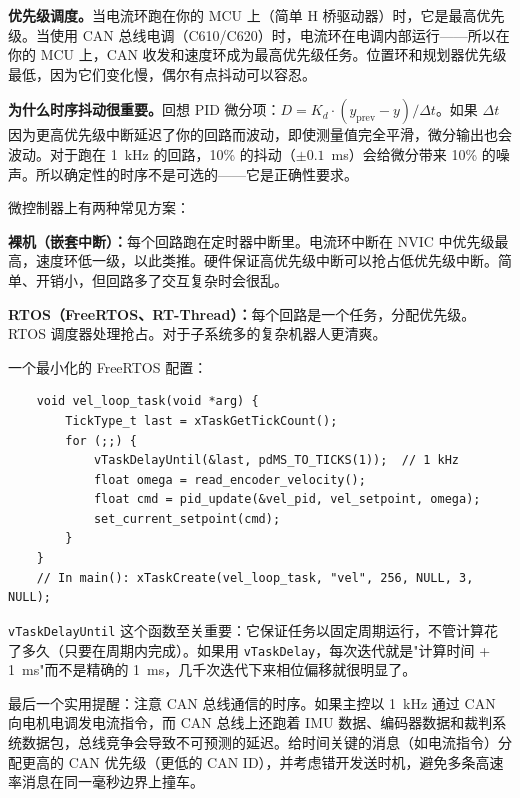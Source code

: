 \textbf{优先级调度。}当电流环跑在你的 MCU 上（简单 H 桥驱动器）时，它是最高优先级。当使用 CAN 总线电调（C610/C620）时，电流环在电调内部运行——所以在你的 MCU 上，CAN 收发和速度环成为最高优先级任务。位置环和规划器优先级最低，因为它们变化慢，偶尔有点抖动可以容忍。

\textbf{为什么时序抖动很重要。}回想 PID 微分项：$D = K_d \cdot (y_{\text{prev}} - y) / \Delta t$。如果 $\Delta t$ 因为更高优先级中断延迟了你的回路而波动，即使测量值完全平滑，微分输出也会波动。对于跑在 1~kHz 的回路，10\% 的抖动（$\pm 0.1$~ms）会给微分带来 10\% 的噪声。所以确定性的时序不是可选的——它是正确性要求。

微控制器上有两种常见方案：

\textbf{裸机（嵌套中断）：}每个回路跑在定时器中断里。电流环中断在 NVIC 中优先级最高，速度环低一级，以此类推。硬件保证高优先级中断可以抢占低优先级中断。简单、开销小，但回路多了交互复杂时会很乱。

\textbf{RTOS（FreeRTOS、RT-Thread）：}每个回路是一个任务，分配优先级。RTOS 调度器处理抢占。对于子系统多的复杂机器人更清爽。

一个最小化的 FreeRTOS 配置：

\begin{verbatim}
    void vel_loop_task(void *arg) {
        TickType_t last = xTaskGetTickCount();
        for (;;) {
            vTaskDelayUntil(&last, pdMS_TO_TICKS(1));  // 1 kHz
            float omega = read_encoder_velocity();
            float cmd = pid_update(&vel_pid, vel_setpoint, omega);
            set_current_setpoint(cmd);
        }
    }
    // In main(): xTaskCreate(vel_loop_task, "vel", 256, NULL, 3, NULL);
\end{verbatim}

\texttt{vTaskDelayUntil} 这个函数至关重要：它保证任务以固定周期运行，不管计算花了多久（只要在周期内完成）。如果用 \texttt{vTaskDelay}，每次迭代就是"计算时间 + 1~ms"而不是精确的 1~ms，几千次迭代下来相位偏移就很明显了。

最后一个实用提醒：注意 CAN 总线通信的时序。如果主控以 1~kHz 通过 CAN 向电机电调发电流指令，而 CAN 总线上还跑着 IMU 数据、编码器数据和裁判系统数据包，总线竞争会导致不可预测的延迟。给时间关键的消息（如电流指令）分配更高的 CAN 优先级（更低的 CAN ID），并考虑错开发送时机，避免多条高速率消息在同一毫秒边界上撞车。

\subsection*{}

